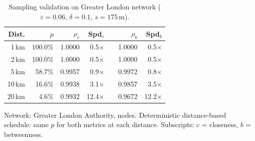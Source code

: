 \begin{table}[htbp]
\centering
\caption{Sampling validation on Greater London network
  ($\varepsilon = 0.06$, $\delta = 0.1$, $s = 175\,$m).}
\label{tab:validation}
\begin{tabular}{rrrrrrr}
\toprule
\textbf{Dist.} &
\textbf{$p$} & \textbf{$\rho_c$} & \textbf{Spd$_c$} &
& \textbf{$\rho_b$} & \textbf{Spd$_b$} \\
\midrule
1\,km & 100.0\% & 1.0000 & 0.5$\times$ & & 1.0000 & 0.5$\times$ \\
2\,km & 100.0\% & 1.0000 & 0.5$\times$ & & 1.0000 & 0.5$\times$ \\
5\,km & 58.7\% & 0.9957 & 0.9$\times$ & & 0.9972 & 0.8$\times$ \\
10\,km & 16.6\% & 0.9938 & 3.1$\times$ & & 0.9857 & 3.5$\times$ \\
20\,km & 4.6\% & 0.9932 & 12.4$\times$ & & 0.9672 & 12.2$\times$ \\
\bottomrule
\end{tabular}

\vspace{0.5em}
\footnotesize
Network: Greater London Authority, \glaNnodes{} nodes. Deterministic distance-based schedule:
same $p$ for both metrics at each distance.
Subscripts: $c$ = closeness, $b$ = betweenness.
\end{table}
